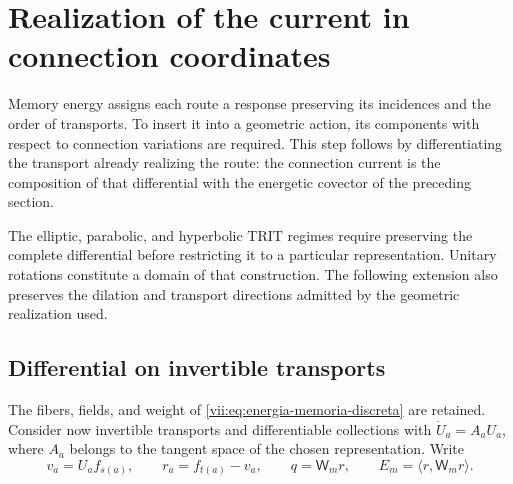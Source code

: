 
\section{Realization of the current in connection coordinates}
\label{vii:sec:composicion-corriente-conexion}

Memory energy assigns each route a response preserving its
incidences and the order of transports. To insert it into a geometric
action, its components with respect to connection variations are
required. This step follows by differentiating the transport already
realizing the route: the connection current is the composition of that
differential with the energetic covector of the preceding section.

The elliptic, parabolic, and hyperbolic TRIT regimes require
preserving the complete differential before restricting it to a
particular representation. Unitary rotations constitute a
domain of that construction. The following extension also preserves
the dilation and transport directions admitted by the geometric
realization used.

\subsection{Differential on invertible transports}

The fibers, fields, and weight of
\eqref{vii:eq:energia-memoria-discreta} are retained. Consider now invertible
transports and differentiable collections with
\(\dot U_a=A_aU_a\), where \(A_a\) belongs to the tangent space
of the chosen representation. Write
\[
 v_a=U_af_{s(a)},\qquad r_a=f_{t(a)}-v_a,\qquad
 q=\mathsf W_mr,\qquad E_m=\langle r,\mathsf W_mr\rangle.
\]

